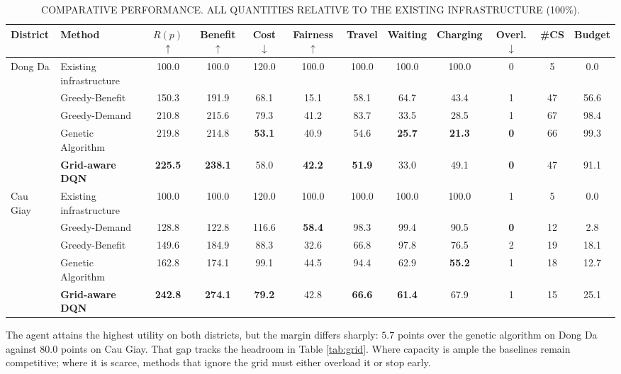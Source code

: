 \documentclass[10pt, conference, a4paper, compsocconf]{IEEEtran}
\begin{document}
\begin{table}[t]
\renewcommand{\arraystretch}{1.2}
\caption{\uppercase{Comparative performance. All quantities relative to the existing infrastructure (100\%).}}
\label{tab:results}
\centering
\scriptsize
\begin{tabular}{llcccccccccc}
\toprule
District & Method & $R(p)$ $\uparrow$ & Benefit $\uparrow$ & Cost $\downarrow$ & Fairness $\uparrow$ & Travel & Waiting & Charging & Overl. $\downarrow$ & \#CS & Budget \\
\midrule
\multirow{5}{*}{Dong Da}
 & Existing infrastructure & 100.0 & 100.0 & 120.0 & 100.0 & 100.0 & 100.0 & 100.0 & 0 & 5 & 0.0 \\
 & Greedy-Benefit          & 150.3 & 191.9 & 68.1 & 15.1 & 58.1 & 64.7 & 43.4 & 1 & 47 & 56.6 \\
 & Greedy-Demand           & 210.8 & 215.6 & 79.3 & 41.2 & 83.7 & 33.5 & 28.5 & 1 & 67 & 98.4 \\
 & Genetic Algorithm       & 219.8 & 214.8 & \textbf{53.1} & 40.9 & 54.6 & \textbf{25.7} & \textbf{21.3} & \textbf{0} & 66 & 99.3 \\
 & \textbf{Grid-aware DQN} & \textbf{225.5} & \textbf{238.1} & 58.0 & \textbf{42.2} & \textbf{51.9} & 33.0 & 49.1 & \textbf{0} & 47 & 91.1 \\
\midrule
\multirow{5}{*}{Cau Giay}
 & Existing infrastructure & 100.0 & 100.0 & 120.0 & 100.0 & 100.0 & 100.0 & 100.0 & 1 & 5 & 0.0 \\
 & Greedy-Demand           & 128.8 & 122.8 & 116.6 & \textbf{58.4} & 98.3 & 99.4 & 90.5 & \textbf{0} & 12 & 2.8 \\
 & Greedy-Benefit          & 149.6 & 184.9 & 88.3 & 32.6 & 66.8 & 97.8 & 76.5 & 2 & 19 & 18.1 \\
 & Genetic Algorithm       & 162.8 & 174.1 & 99.1 & 44.5 & 94.4 & 62.9 & \textbf{55.2} & 1 & 18 & 12.7 \\
 & \textbf{Grid-aware DQN} & \textbf{242.8} & \textbf{274.1} & \textbf{79.2} & 42.8 & \textbf{66.6} & \textbf{61.4} & 67.9 & 1 & 15 & 25.1 \\
\bottomrule
\end{tabular}
\end{table}

The agent attains the highest utility on both districts, but the margin differs sharply: $5.7$ points over the genetic algorithm on Dong Da against $80.0$ points on Cau Giay. That gap tracks the headroom in Table \ref{tab:grid}. Where capacity is ample the baselines remain competitive; where it is scarce, methods that ignore the grid must either overload it or stop early.
\end{document}
